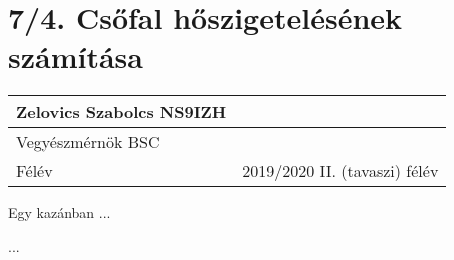 \section*{7/4. Csőfal hőszigetelésének számítása}


\begin{tabular}{ | p{2cm} | p{14cm} | } 
	\hline
	Zelovics Szabolcs NS9IZH \\ 
	\hline
	Vegyészmérnök BSC \\ 
	\hline
	Félév & 2019/2020 II. (tavaszi) félév \\ 
	\hline
\end{tabular}
\vspace{0.5cm}

\noindent Egy kazánban ...

...

\pagebreak
